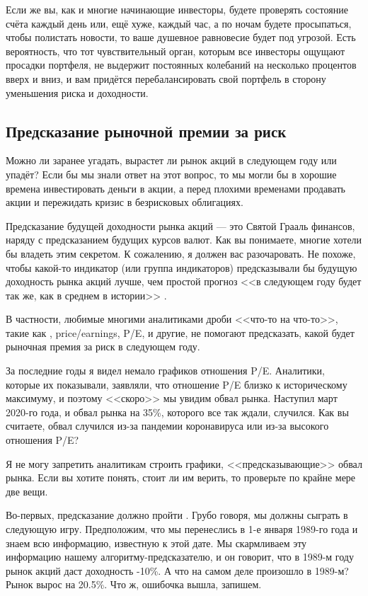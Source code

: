 Если же вы, как и многие начинающие инвесторы, будете проверять состояние счёта 
каждый день или, ещё хуже, каждый час, а по ночам будете просыпаться, чтобы 
полистать новости, то ваше душевное равновесие будет под угрозой. Есть 
вероятность, что тот чувствительный орган, которым все инвесторы ощущают 
просадки портфеля, не выдержит постоянных колебаний на несколько процентов вверх 
и вниз, и вам придётся перебалансировать свой портфель в сторону уменьшения 
риска и доходности.

\subsection{Предсказание рыночной премии за риск}

Можно ли заранее угадать, вырастет ли рынок акций в следующем году или упадёт? 
Если бы мы знали ответ на этот вопрос, то мы могли бы в хорошие времена 
инвестировать деньги в акции, а перед плохими временами продавать акции и 
пережидать кризис в безрисковых облигациях.

Предсказание будущей доходности рынка акций --- это Святой Грааль финансов, 
наряду с предсказанием будущих курсов валют. Как вы понимаете, многие хотели бы 
владеть этим секретом. К сожалению, я должен вас разочаровать. Не похоже, чтобы 
какой-то индикатор (или группа индикаторов) предсказывали бы будущую доходность 
рынка акций лучше, чем простой прогноз <<в следующем году будет так же, как в 
среднем в истории>> \cite{welch2008comprehensive}.

В частности, любимые многими аналитиками дроби <<что-то на что-то>>, такие 
как , 
{price/earnings, P/E},  и 
другие, не помогают предсказать, какой будет рыночная премия за риск в следующем 
году. 

За последние годы я видел немало графиков отношения P/E. Аналитики, которые их 
показывали, заявляли, что отношение P/E близко к историческому максимуму, и 
поэтому <<скоро>> мы увидим обвал рынка. Наступил март 2020-го года, и обвал 
рынка на 35\%, которого все так ждали, случился. Как вы считаете, обвал случился 
из-за пандемии коронавируса или из-за высокого отношения P/E?

Я не могу запретить аналитикам строить графики, <<предсказывающие>> обвал рынка. 
Если вы хотите понять, стоит ли им верить, то проверьте по крайне мере две вещи.

Во-первых, предсказание должно пройти  . Грубо говоря, мы должны сыграть в следующую игру. 
Предположим, что мы перенеслись в 1-е января 1989-го года и знаем всю 
информацию, известную к этой дате. Мы скармливаем эту информацию нашему 
алгоритму-предсказателю, и он говорит, что в 1989-м году рынок акций даст 
доходность -10\%. А что на самом деле произошло в 1989-м? Рынок вырос на 20.5\%. 
Что ж, ошибочка вышла, запишем.

